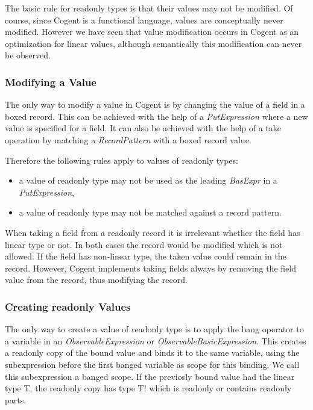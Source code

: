 \documentclass[a4paper]{report}
\newcommand{\cogent}{Cogent\xspace}
\begin{document}
The basic rule for readonly types is that their values may not be modified. Of course, since \cogent is a functional language,
values are conceptually never modified. However we have seen that value modification occurs in \cogent as an optimization for
linear values, although semantically this modification can never be observed. 

\subsubsection{Modifying a Value}

The only way to modify a value in \cogent is by changing the value of a field in a boxed record. This can be achieved
with the help of a \textit{PutExpression} where a new value is specified for a field. It can also be achieved with the
help of a  take operation by matching a \textit{RecordPattern} with a boxed record value. 

Therefore the following rules apply to values of readonly types:
\begin{itemize}
\item a value of readonly type may not be used as the leading \textit{BasExpr} in a \textit{PutExpression},
\item a value of readonly type may not be matched against a  record pattern.
\end{itemize}


When taking a field from a readonly record it is irrelevant whether the field has linear type or not. In both cases
the record would be modified which is not allowed. If the field has non-linear type, the taken value could
remain in the record. However, \cogent implements taking fields always by removing the field value from the record, 
thus modifying the record.


\subsubsection{Creating readonly Values}

The only way to create a value of readonly type is to apply the bang operator to a variable in an
\textit{ObservableExpression} or \textit{ObservableBasicExpression}. This creates a readonly copy of the bound value
and binds it to the same variable, using the subexpression  before the first banged variable  as scope for this binding. We call this subexpression a
banged scope. If the previosly bound value had the linear type T, the readonly copy has type T! which is readonly or contains
readonly parts.
\end{document}
